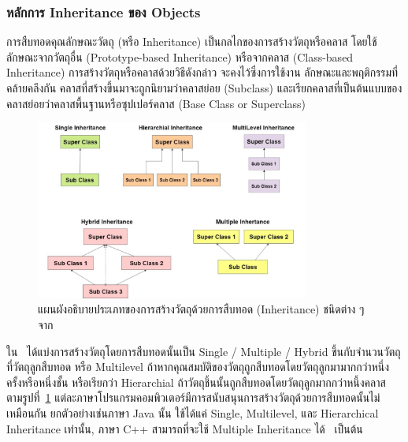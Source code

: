 \documentclass[12pt,one side,openright,a4paper]{cpe-thesis-th}
\newcommand{\thaijustify}[1]{%
  \par\hspace{30pt}\justifying
  #1
}
\begin{document}
        \subsubsection{หลักการ Inheritance ของ Objects}
            \thaijustify{
                การสืบทอดคุณลักษณะวัตถุ (หรือ Inheritance) เป็นกลไกของการสร้างวัตถุหรือคลาส โดยใช้ลักษณะจากวัตถุอื่น (Prototype-based Inheritance) หรือจากคลาส (Class-based Inheritance) การสร้างวัตถุหรือคลาสด้วยวิธีดังกล่าว จะคงไว้ซึ่งการใช้งาน ลักษณะและพฤติกรรมที่คล้ายคลึงกัน คลาสที่สร้างขึ้นมาจะถูกนิยามว่าคลาสย่อย (Subclass) และเรียกคลาสที่เป็นต้นแบบของคลาสย่อยว่าคลาสพื้นฐานหรือซุปเปอร์คลาส (Base Class or Superclass)~\cite{johnson88classobj}
            }
            \begin{figure}[H]
                \centering
                \includegraphics[width=9cm]{figure/literature/oop-inheritance.jpg}
                \caption[แผนผังอธิบายประเภทของการสร้างวัตถุด้วยการสืบทอดชนิดต่าง ๆ]{แผนผังอธิบายประเภทของการสร้างวัตถุด้วยการสืบทอด (Inheritance) ชนิดต่าง ๆ จาก~\cite{sakpal18inheritance}}
                \label{fig:oop-inheritance}
            \end{figure}
            \thaijustify{ 
                ใน~\cite{sakpal18inheritance} ได้แบ่งการสร้างวัตถุโดยการสืบทอดนั้นเป็น Single / Multiple / Hybrid ขึ้นกับจำนวนวัตถุที่วัตถุลูกสืบทอด หรือ Multilevel ถ้าหากคุณสมบัติของวัตถุถูกสืบทอดโดยวัตถุลูกมามากกว่าหนึ่งครั้งหรือหนึ่งชั้น หรือเรียกว่า Hierarchial ถ้าวัตถุชิ้นนั้นถูกสืบทอดโดยวัตถุลูกมากกว่าหนึ้งคลาส ตามรูปที่~\ref{fig:oop-inheritance} แต่ละภาษาโปรแกรมคอมพิวเตอร์มีการสนับสนุนการสร้างวัตถุด้วยการสืบทอดนั้นไม่เหมือนกัน ยกตัวอย่างเช่นภาษา Java นั้น ใช้ได้แค่ Single, Multilevel, และ Hierarchical Inheritance เท่านั้น, ภาษา C++ สามารถที่จะใช้ Multiple Inheritance ได้~\cite{stroustrup94inheritance} เป็นต้น
            }
\end{document}
